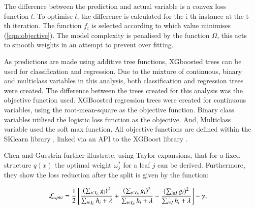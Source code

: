\documentclass[review,12pt,authoryear]{elsarticle}
\begin{document}
\begin{linenumbers}
The difference between the prediction and actual variable is a convex loss function $l$. To optimise $l$, the difference is calculated for the i-th instance at the t-th iteration. The function $f_t$ is selected according to which value minimises (\ref{eqn:objective}). The model complexity is penalised by the function $\Omega$, this acts to smooth weights in an attempt to prevent over fitting.
\par
As predictions are made using additive tree functions, XGboosted trees can be used for classification and regression. Due to the mixture of continuous, binary and multiclass variables in this analysis, both classification and regression trees were created. The difference between the trees created for this analysis was the objective function used. XGBoosted regression trees were created for continuous variables, using the root-mean-square as the objective function. Binary class variables utilised the logistic loss function as the objective. And, Multiclass variable used the soft max function. All objective functions are defined within the SKlearn library \citep{sklearn_api}, linked via an API to the XGBoost library \citep{chenXGBoostScalableTree2016}.
\par
Chen and Guestrin \citep{chenXGBoostScalableTree2016} further illustrate, using Taylor expansions, that for a fixed structure $q(x)$ the optimal weight $\omega^*_j$ for a leaf $j$ can be derived. Furthermore, they show the loss reduction after the split is given by the function:

\begin{equation} \label{eqn:enumerate}
\mathcal{L}_{split} = {{1}\over{2}} \left[ 
  {{(\sum_{i\in I_L}g_i)^{2}}\over{\sum_{i\in I_L} h_i + \lambda}} +
  {{(\sum_{i\in I_R}g_i)^{2}}\over{\sum_{i\in I_R} h_i + \lambda}} -
  {{(\sum_{i\in I}{g_i})^{2}}\over{\sum_{i \in I} h_i + \lambda}} \right] - \gamma,
\end{equation}


\end{linenumbers}
\end{document}
